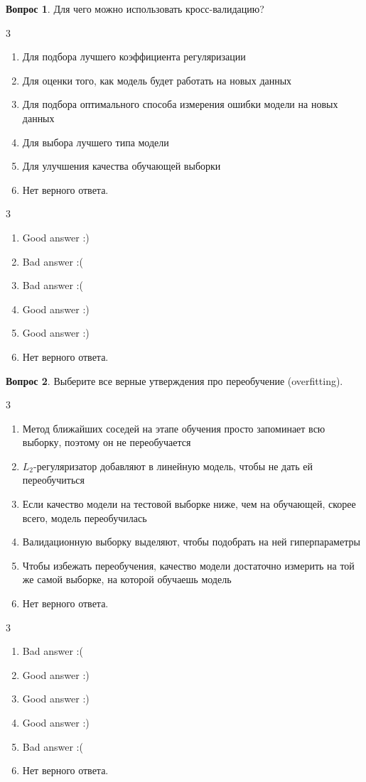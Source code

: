 \documentclass[12pt]{article}
\newenvironment{answerlist}[1][3]{
\begin{multicols}{#1}

\begin{enumerate}[label=\fbox{\emph{\Alph*}},ref=\emph{\alph*}]
}
{
\item Нет верного ответа.
\end{enumerate}
\end{multicols}
}
\theoremstyle{definition}
\newtheorem{question}{Вопрос}
\begin{document}
\begin{question}
Для чего можно использовать кросс-валидацию?
\begin{answerlist}
   \item  Для подбора лучшего коэффициента регуляризации
   \item  Для оценки того, как модель будет работать на новых данных
   \item  Для подбора оптимального способа измерения ошибки модели на новых данных
  \item  Для выбора лучшего типа модели
  \item  Для улучшения качества обучающей выборки
\end{answerlist}
\end{question}

\begin{solution}
\begin{answerlist}
  \item Good answer :)
  \item Bad answer :(
  \item Bad answer :(
  \item Good answer :)
  \item Good answer :)
\end{answerlist}
\end{solution}

\newpage 

\begin{question}
Выберите все верные утверждения про переобучение (overfitting).
\begin{answerlist}
   \item  Метод ближайших соседей на этапе обучения просто запоминает всю выборку, поэтому он не переобучается
   \item  $L_2$-регуляризатор добавляют в линейную модель, чтобы не дать ей переобучиться
   \item  Если качество модели на тестовой выборке ниже, чем на обучающей, скорее всего, модель переобучилась
   \item  Валидационную выборку выделяют, чтобы подобрать на ней гиперпараметры
   \item  Чтобы избежать переобучения, качество модели достаточно измерить на той же самой выборке, на которой обучаешь модель
\end{answerlist}
\end{question}

\begin{solution}
\begin{answerlist}
  \item Bad answer :(
  \item Good answer :)
  \item Good answer :)
  \item Good answer :)
  \item Bad answer :(
\end{answerlist}
\end{solution}
\end{document}
